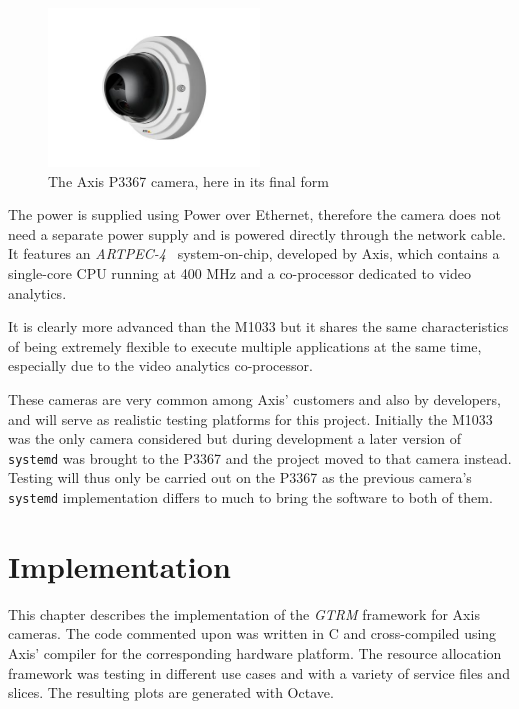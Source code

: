\documentclass[nobiblatex]{LTHthesis}
\begin{document}
\begin{figure}[h]
    \centering
    \includegraphics[width=0.5\textwidth]{p3367incase}
    \caption{The Axis P3367 camera, here in its final form}
    \label{fig:P3367case}
\end{figure}

The power is supplied using Power over Ethernet, therefore the camera does 
not need a separate power supply and is powered directly through the network
cable. It features an \emph{ARTPEC-4}~\cite{artpec-4} system-on-chip, developed 
by Axis, which contains a single-core CPU running at 400 MHz and a 
co-processor dedicated to video analytics.

It is clearly more advanced than the M1033 but it shares the same
characteristics of being extremely flexible to execute multiple applications
at the same time, especially due to the video analytics co-processor.

These cameras are very common among Axis' customers and also by
developers, and will serve as realistic testing platforms for this project. 
Initially the M1033 was the only camera considered but during development a 
later version of \texttt{systemd} was brought to the P3367 and the project moved to 
that camera instead. Testing will thus only be carried out on the P3367 
as the previous camera's \texttt{systemd} implementation differs to much to bring the software to both of them.

\chapter{Implementation}
\label{chp:development}

This chapter describes the implementation of the \emph{GTRM} framework for
Axis cameras. The code commented upon was written in C and cross-compiled 
using Axis' compiler for the corresponding hardware platform. The resource
allocation framework was testing in different use cases and with a
variety of service files and slices. The resulting plots are generated with
Octave.
\end{document}
